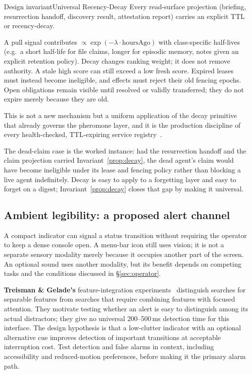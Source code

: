 \documentclass[11pt,a4paper]{article}
\theoremstyle{definition}
\theoremstyle{plain}
\begin{document}
\begin{pdclaim}{Design invariant}{Universal Recency-Decay}
\setlength{\parskip}{4pt plus 1pt}
\label{prop:decay}
Every read-surface projection (briefing, resurrection handoff, discovery result,
attestation report) carries an explicit TTL or recency-decay.

A pull signal
contributes $\propto \exp(-\lambda \cdot \text{hoursAgo})$ with class-specific
half-lives (e.g.\ a short half-life for file claims, longer for episodic memory,
notes given an explicit retention policy). Decay changes ranking weight; it
does not remove authority. A stale high score can still exceed a low fresh
score. Expired leases must instead become ineligible, and effects must reject
their old fencing epochs. Open obligations remain visible until resolved or
validly transferred; they do not expire merely because they are old.

This is not a new mechanism but a uniform application of the decay primitive that
already governs the pheromone layer, and it is the production discipline of every
health-checked, TTL-expiring service registry~.
\end{pdclaim}

The dead-claim case is the worked instance: had the resurrection handoff and the
claim projection carried Invariant~\ref{prop:decay}, the dead agent's claim would have
become ineligible under its lease and fencing policy rather than blocking
a live agent indefinitely. Decay is easy to apply to a
forgetting layer and easy to forget on a digest; Invariant~\ref{prop:decay} closes that
gap by making it universal.

\subsection{Ambient legibility: a proposed alert channel}\label{sec:ambient}

A compact indicator can signal a status transition without requiring the operator
to keep a dense console open. A menu-bar icon still uses vision; it is not
a separate sensory modality merely because it occupies another part of the
screen. An optional sound uses another modality, but its benefit depends on
competing tasks and the conditions discussed in \S\ref{sec:operator}.

\textbf{Treisman \& Gelade's} feature-integration experiments~
distinguish searches for separable features from searches that require combining
features with focused attention. They motivate testing whether an alert is easy
to distinguish among its actual distractors; they give no universal
200--500\,ms detection time for this interface. The design hypothesis is that a
low-clutter indicator with an optional alternative cue improves detection of
important transitions at acceptable interruption cost. Test detection and false
alarms in context, including accessibility and reduced-motion preferences, before
making it the primary alarm path.
\end{document}
